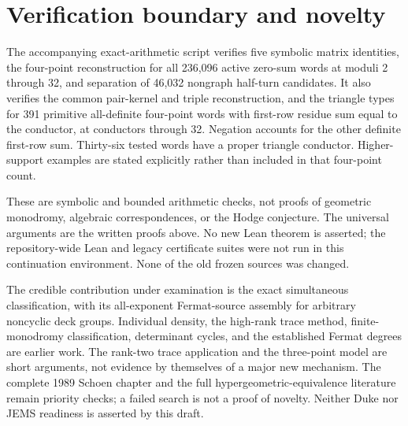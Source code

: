 \documentclass[11pt]{article}
\theoremstyle{remark}\newtheorem{remark}[theorem]{Remark}
\begin{document}
\section{Verification boundary and novelty}
The accompanying exact-arithmetic script verifies five symbolic matrix
identities, the four-point reconstruction for all 236,096 active zero-sum
words at moduli 2 through 32, and separation of 46,032 nongraph half-turn
candidates. It also verifies the common pair-kernel and triple reconstruction,
and the triangle types for 391 primitive all-definite four-point words with
first-row residue sum equal to the conductor, at conductors through 32.
Negation accounts for the other definite first-row sum. Thirty-six tested
words have a proper triangle conductor. Higher-support examples are stated
explicitly rather than included in that four-point count.

These are symbolic and bounded arithmetic checks, not proofs of geometric
monodromy, algebraic correspondences, or the Hodge conjecture. The universal
arguments are the written proofs above. No new Lean theorem is asserted;
the repository-wide Lean and legacy certificate suites were not run in
this continuation environment. None of the old frozen sources was changed.

The credible contribution under examination is the exact simultaneous
classification, with its all-exponent Fermat-source assembly for arbitrary
noncyclic deck groups. Individual density, the high-rank trace method,
finite-monodromy classification, determinant cycles, and the established
Fermat degrees are earlier work. The rank-two trace application and the
three-point model are short arguments, not evidence by themselves of a
major new mechanism. The complete 1989 Schoen chapter and the full
hypergeometric-equivalence literature remain priority checks; a failed
search is not a proof of novelty. Neither Duke nor JEMS readiness is
asserted by this draft.
\end{document}
